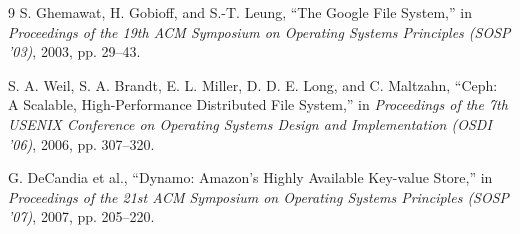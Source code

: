 \documentclass[11pt,a4paper]{article}
\begin{document}
\begin{thebibliography}{9}
S. Ghemawat, H. Gobioff, and S.-T. Leung, 
``The Google File System,'' 
in \textit{Proceedings of the 19th ACM Symposium on Operating Systems Principles (SOSP '03)}, 2003, pp. 29--43.

S. A. Weil, S. A. Brandt, E. L. Miller, D. D. E. Long, and C. Maltzahn, 
``Ceph: A Scalable, High-Performance Distributed File System,'' 
in \textit{Proceedings of the 7th USENIX Conference on Operating Systems Design and Implementation (OSDI '06)}, 2006, pp. 307--320.

G. DeCandia et al., 
``Dynamo: Amazon's Highly Available Key-value Store,'' 
in \textit{Proceedings of the 21st ACM Symposium on Operating Systems Principles (SOSP '07)}, 2007, pp. 205--220.
\end{thebibliography}
\end{document}
